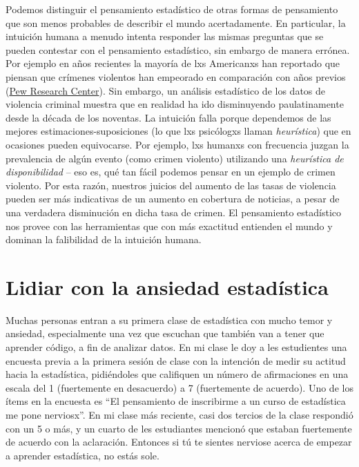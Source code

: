 \documentclass[
  12pt,
]{book}
\begin{document}
Podemos distinguir el pensamiento estadístico de otras formas de pensamiento que son menos probables de describir el mundo acertadamente. En particular, la intuición humana a menudo intenta responder las mismas preguntas que se pueden contestar con el pensamiento estadístico, sin embargo de manera errónea. Por ejemplo en años recientes la mayoría de lxs Americanxs han reportado que piensan que crímenes violentos han empeorado en comparación con años previos (\href{http://www.pewresearch.org/fact-tank/2018/01/30/5-facts-about-crime-in-the-u-s/}{Pew Research Center}). Sin embargo, un análisis estadístico de los datos de violencia criminal muestra que en realidad ha ido disminuyendo paulatinamente desde la década de los noventas. La intuición falla porque dependemos de las mejores estimaciones-suposiciones (lo que lxs psicólogxs llaman \emph{heurística}) que en ocasiones pueden equivocarse. Por ejemplo, lxs humanxs con frecuencia juzgan la prevalencia de algún evento (como crimen violento) utilizando una \emph{heurística de disponibilidad} -- eso es, qué tan fácil podemos pensar en un ejemplo de crimen violento. Por esta razón, nuestros juicios del aumento de las tasas de violencia pueden ser más indicativas de un aumento en cobertura de noticias, a pesar de una verdadera disminución en dicha tasa de crimen. El pensamiento estadístico nos provee con las herramientas que con más exactitud entienden el mundo y dominan la falibilidad de la intuición humana.

\hypertarget{lidiar-con-la-ansiedad-estaduxedstica}{%
\section{Lidiar con la ansiedad estadística}\label{lidiar-con-la-ansiedad-estaduxedstica}}

Muchas personas entran a su primera clase de estadística con mucho temor y ansiedad, especialmente una vez que escuchan que también van a tener que aprender código, a fin de analizar datos. En mi clase le doy a les estudientes una encuesta previa a la primera sesión de clase con la intención de medir su actitud hacia la estadística, pidiéndoles que califiquen un número de afirmaciones en una escala del 1 (fuertemente en desacuerdo) a 7 (fuertemente de acuerdo). Uno de los ítems en la encuesta es ``El pensamiento de inscribirme a un curso de estadística me pone nerviosx''. En mi clase más reciente, casi dos tercios de la clase respondió con un 5 o más, y un cuarto de les estudiantes mencionó que estaban fuertemente de acuerdo con la aclaración. Entonces si tú te sientes nerviose acerca de empezar a aprender estadística, no estás sole.
\end{document}
